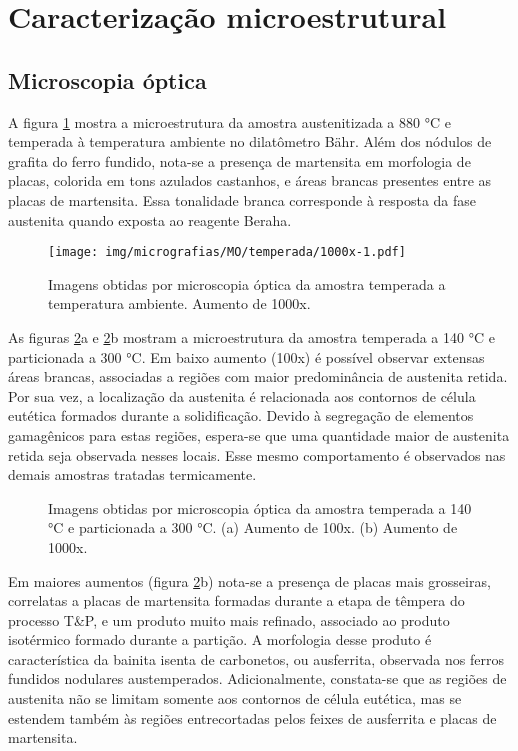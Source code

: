 \section{Caracteriza\c{c}\~{a}o microestrutural}

\label{sec:micros}

\subsection{Microscopia óptica}

A figura \ref{fig:temperada} mostra a microestrutura da amostra austenitizada a 880 °C e temperada à temperatura ambiente no dilatômetro Bähr. Além dos nódulos de grafita do ferro fundido, nota-se a presença de martensita em morfologia de placas, colorida em tons azulados castanhos, e áreas brancas presentes entre as placas de martensita. Essa tonalidade branca corresponde à resposta da fase austenita quando exposta ao reagente Beraha.

\begin{figure}
	\texttt{[image: img/micrografias/MO/temperada/1000x-1.pdf]}
	\caption{Imagens obtidas por microscopia óptica da amostra temperada a temperatura ambiente. Aumento de 1000x.}
	\label{fig:temperada}
\end{figure}

As figuras \ref{fig:TT140TP300}a e \ref{fig:TT140TP300}b mostram a microestrutura da amostra temperada a 140 °C e particionada a 300 °C. Em baixo aumento (100x) é possível observar extensas áreas brancas, associadas a regiões com maior predominância de austenita retida. Por sua vez, a localização da austenita é relacionada aos contornos de célula eutética formados durante a solidificação. Devido à segregação de elementos gamagênicos para estas regiões, espera-se que uma quantidade maior de austenita retida seja observada nesses locais. Esse mesmo comportamento é observados nas demais amostras tratadas termicamente.

\begin{figure}
	\vspace{0pt}
	\caption{Imagens obtidas por microscopia óptica da amostra temperada a 140 °C e particionada a 300 °C. (a) Aumento de 100x. (b) Aumento de 1000x.}
	\label{fig:TT140TP300}
\end{figure}

Em maiores aumentos (figura \ref{fig:TT140TP300}b) nota-se a presença de placas mais grosseiras, correlatas a placas de martensita formadas durante a etapa de têmpera do processo T\&P, e um produto muito mais refinado, associado ao produto isotérmico formado durante a partição. A morfologia desse produto é característica da bainita isenta de carbonetos, ou ausferrita, observada nos ferros fundidos nodulares austemperados. Adicionalmente, constata-se que as regiões de austenita não se limitam somente aos contornos de célula eutética, mas se estendem também às regiões entrecortadas pelos feixes de ausferrita e placas de martensita.

